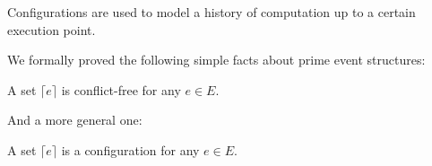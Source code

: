 Configurations are used to model a history of computation up to a certain 
execution point.

We formally proved the following simple facts about prime event structures:

\begin{lemma}
  A set $\lceil e \rceil$ is conflict-free for any $e \in E$.
\end{lemma}

And a more general one:

\begin{lemma}
  A set $\lceil e \rceil$ is a configuration for any $e \in E$.
\end{lemma}
